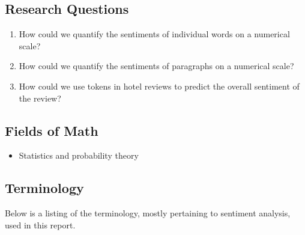 \documentclass[12pt, bibliography=totocnumbered, paper=a4]{scrartcl}
\begin{document}
\subsection{Research Questions}
\begin{enumerate}
	\item How could we quantify the sentiments of individual words on a numerical scale?
	\item How could we quantify the sentiments of paragraphs on a numerical scale?
	\item How could we use tokens in hotel reviews to predict the overall sentiment of the review?
\end{enumerate}

\subsection{Fields of Math}
\begin{itemize}
	\item Statistics and probability theory
\end{itemize}

\subsection{Terminology}
Below is a listing of the terminology, mostly pertaining to sentiment
analysis, used in this report.
\end{document}
